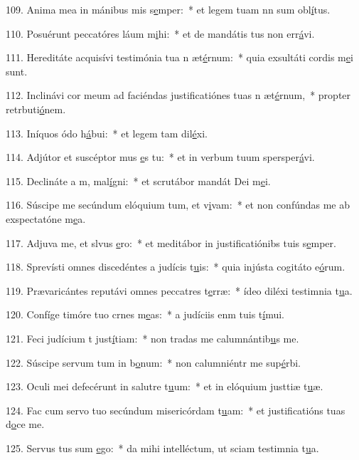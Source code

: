 109. Anima mea in mánibus mis s\uline{e}mper:~* et legem tuam nn sum obl\uline{í}tus.\par 
110. Posuérunt peccatóres láum m\uline{i}hi:~* et de mandátis tus non err\uline{á}vi.\par 
111. Hereditáte acquisívi testimónia tua n æt\uline{é}rnum:~* quia exsultáti cordis m\uline{e}i sunt.\par 
112. Inclinávi cor meum ad faciéndas justificatiónes tuas n æt\uline{é}rnum,~* propter retrbuti\uline{ó}nem.\par 
113. Iníquos ódo h\uline{á}bui:~* et legem tam dil\uline{é}xi.\par 
114. Adjútor et suscéptor mus \uline{e}s tu:~* et in verbum tuum spersper\uline{á}vi.\par 
115. Declináte a m, mal\uline{í}gni:~* et scrutábor mandát Dei m\uline{e}i.\par 
116. Súscipe me secúndum elóquium tum, et v\uline{i}vam:~* et non confúndas me ab exspectatóne m\uline{e}a.\par 
117. Adjuva me, et slvus \uline{e}ro:~* et meditábor in justificatiónibs tuis s\uline{e}mper.\par 
118. Sprevísti omnes discedéntes a judícis t\uline{u}is:~* quia injústa cogitáto e\uline{ó}rum.\par 
119. Prævaricántes reputávi omnes peccatres t\uline{e}rræ:~* ídeo diléxi testimnia t\uline{u}a.\par 
120. Confíge timóre tuo crnes m\uline{e}as:~* a judíciis enm tuis t\uline{í}mui.\par 
121. Feci judícium t just\uline{í}tiam:~* non tradas me calumnántib\uline{u}s me.\par 
122. Súscipe servum tum in b\uline{o}num:~* non calumniéntr me sup\uline{é}rbi.\par 
123. Oculi mei defecérunt in salutre t\uline{u}um:~* et in elóquium justtiæ t\uline{u}æ.\par 
124. Fac cum servo tuo secúndum misericórdam t\uline{u}am:~* et justificatións tuas d\uline{o}ce me.\par 
125. Servus tus sum \uline{e}go:~* da mihi intelléctum, ut sciam testimnia t\uline{u}a.\par 

